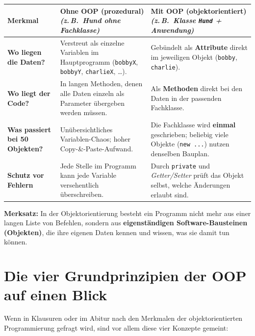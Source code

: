 \begin{center}
\bgroup
\def\arraystretch{1.25}
\begin{tabularx}{\textwidth}{|p{3.4cm}|X|X|}
\hline
\textbf{Merkmal} &
\textbf{Ohne OOP (prozedural)}\newline \small\textit{(z.\,B.\ Hund ohne Fachklasse)} &
\textbf{Mit OOP (objektorientiert)}\newline \small\textit{(z.\,B.\ Klasse \texttt{Hund} + Anwendung)} \\ \hline
\textbf{Wo liegen die Daten?} &
Verstreut als einzelne Variablen im Hauptprogramm (\lstinline|bobbyX|, \lstinline|bobbyY|, \lstinline|charlieX|, \ldots). &
Gebündelt als \textbf{Attribute} direkt im jeweiligen Objekt (\lstinline|bobby|, \lstinline|charlie|). \\ \hline
\textbf{Wo liegt der Code?} &
In langen Methoden, denen alle Daten einzeln als Parameter übergeben werden müssen. &
Als \textbf{Methoden} direkt bei den Daten in der passenden Fachklasse. \\ \hline
\textbf{Was passiert bei 50 Objekten?} &
Unübersichtliches Variablen-Chaos; hoher Copy-\&-Paste-Aufwand. &
Die Fachklasse wird \textbf{einmal} geschrieben; beliebig viele Objekte (\lstinline|new ...|) nutzen denselben Bauplan. \\ \hline
\textbf{Schutz vor Fehlern} &
Jede Stelle im Programm kann jede Variable versehentlich überschreiben. &
Durch \lstinline|private| und \emph{Getter/Setter} prüft das Objekt selbst, welche Änderungen erlaubt sind. \\ \hline
\end{tabularx}
\egroup
\end{center}

\medskip
\noindent \textbf{Merksatz:} In der Objektorientierung besteht ein Programm nicht
mehr aus einer langen Liste von Befehlen, sondern aus \textbf{eigenständigen
Software-Bausteinen (Objekten)}, die ihre eigenen Daten kennen und wissen, was
sie damit tun können.


\section{Die vier Grundprinzipien der OOP auf einen Blick}

Wenn in Klausuren oder im Abitur nach den Merkmalen der objektorientierten
Programmierung gefragt wird, sind vor allem diese vier Konzepte gemeint:

